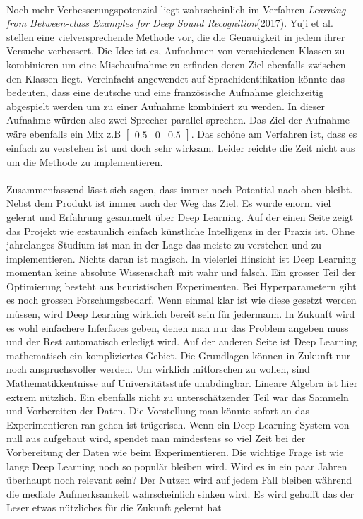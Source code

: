 \\
Noch mehr Verbesserungspotenzial liegt wahrscheinlich im Verfahren \textit{Learning from Between-class Examples for Deep Sound Recognition}(2017)\parencite{between}. Yuji et al. stellen eine vielversprechende Methode vor, die die Genauigkeit in jedem ihrer Versuche verbessert. Die Idee ist es, Aufnahmen von verschiedenen Klassen zu kombinieren um eine Mischaufnahme zu erfinden deren Ziel ebenfalls zwischen den Klassen liegt. Vereinfacht angewendet auf Sprachidentifikation könnte das bedeuten, dass eine deutsche und eine französische Aufnahme gleichzeitig abgespielt werden um zu einer Aufnahme kombiniert zu werden. In dieser Aufnahme würden also zwei Sprecher parallel sprechen. Das Ziel der Aufnahme wäre ebenfalls ein Mix z.B $\begin{bmatrix}0.5 & 0 & 0.5 \end{bmatrix}$. Das schöne am Verfahren ist, dass es einfach zu verstehen ist und doch sehr wirksam. Leider reichte die Zeit nicht aus um die Methode zu implementieren.
\\ \\ 
Zusammenfassend lässt sich sagen, dass immer noch Potential nach oben bleibt. Nebst dem Produkt ist immer auch der Weg das Ziel. Es wurde enorm viel gelernt und Erfahrung gesammelt über Deep Learning. Auf der einen Seite zeigt das Projekt wie erstaunlich einfach künstliche Intelligenz in der Praxis ist. Ohne jahrelanges Studium ist man in der Lage das meiste zu verstehen und zu implementieren. Nichts daran ist magisch. In vielerlei Hinsicht ist Deep Learning momentan keine absolute Wissenschaft mit wahr und falsch. Ein grosser Teil der Optimierung besteht aus heuristischen Experimenten. Bei Hyperparametern gibt es noch grossen Forschungsbedarf. Wenn einmal klar ist wie diese gesetzt werden müssen, wird Deep Learning wirklich bereit sein für jedermann. In Zukunft wird es wohl einfachere Inferfaces geben, denen man nur das Problem angeben muss und der Rest automatisch erledigt wird. Auf der anderen Seite ist Deep Learning mathematisch ein kompliziertes Gebiet. Die Grundlagen können in Zukunft nur noch anspruchsvoller werden. Um wirklich mitforschen zu wollen, sind Mathematikkentnisse auf Universitätsstufe unabdingbar. Lineare Algebra ist hier extrem nützlich. Ein ebenfalls nicht zu unterschätzender Teil war das Sammeln und Vorbereiten der Daten. Die Vorstellung man könnte sofort an das Experimentieren ran gehen ist trügerisch. Wenn ein Deep Learning System von null aus aufgebaut wird, spendet man mindestens so viel Zeit bei der Vorbereitung der Daten wie beim Experimentieren. Die wichtige Frage ist wie lange Deep Learning noch so populär bleiben wird. Wird es in ein paar Jahren überhaupt noch relevant sein? Der Nutzen wird auf jedem Fall bleiben während die mediale Aufmerksamkeit wahrscheinlich sinken wird. Es wird gehofft das der Leser etwas nützliches für die Zukunft gelernt hat
